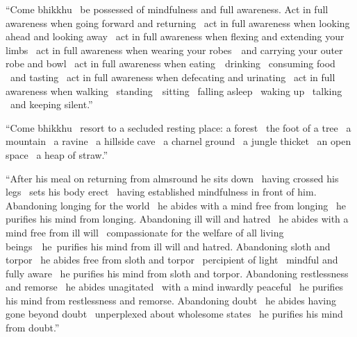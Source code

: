 \begin{english-only-justify}
  ``Come bhikkhu \breathmark\ be possessed of mindfulness and full awareness. Act in full awareness when going forward and returning \breathmark\ act in full awareness when looking ahead and looking away \breathmark\ act in full awareness when flexing and extending your limbs \breathmark\ act in full awareness when wearing your \mbox{robes}~\breathmark\ and carrying your outer robe and bowl \breathmark\ act in full awareness when \mbox{eating}~\breathmark\ drinking \breathmark\ consuming food \breathmark\ and tasting \breathmark\ act in full awareness when defecating and urinating \breathmark\ act in full awareness when walking \breathmark\ \mbox{standing}~\breathmark\ sitting \breathmark\ falling asleep \breathmark\ waking up\makeatletter\hyperlink{endnote60-appendix}\makeatother
  \breathmark\ talking \breathmark\ and keeping silent.''
\end{english-only-justify}

\begin{english-only-justify}
  ``Come bhikkhu \breathmark\ resort to a secluded resting place: a forest \breathmark\ the foot of a tree \breathmark\ a mountain \breathmark\ a ravine \breathmark\ a hillside cave \breathmark\ a charnel ground \breathmark\ a jungle thicket \breathmark\ an open space \breathmark\ a heap of straw.''
\end{english-only-justify}

\begin{english-only-justify}
  ``After his meal on returning from almsround he sits down \breathmark\ having crossed his legs \breathmark\ sets his body erect \breathmark\ having established mindfulness in front of him. Abandoning longing\makeatletter\hyperlink{endnote61-appendix}\makeatother\thinspace
  for the world \breathmark\ he abides with a mind free from longing \breathmark\ he purifies his mind from longing. Abandoning ill will and hatred \breathmark\ he abides with a mind free from ill will \breathmark\ compassionate for the welfare of all living \mbox{beings}~\breathmark\ he~purifies his mind from ill will and hatred. Abandoning sloth and torpor \breathmark\ he abides free from sloth and torpor \breathmark\ percipient of light \breathmark\ mindful and fully aware \breathmark\ he purifies his mind from sloth and torpor. Abandoning restlessness and remorse \breathmark\ he abides unagitated \breathmark\ with a mind inwardly peaceful \breathmark\ he purifies his mind from restlessness and remorse. Abandoning doubt \breathmark\ he abides having gone beyond doubt \breathmark\ unperplexed about wholesome states \breathmark\ he purifies his mind from doubt.''
\end{english-only-justify}


